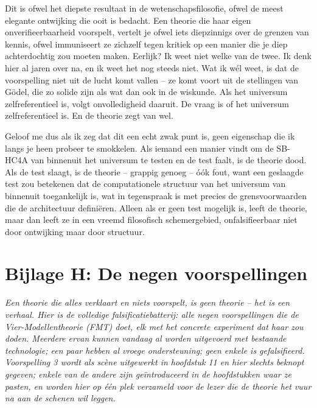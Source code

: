 \documentclass[11pt, twoside, openright]{book}
\begin{document}
Dit is ofwel het diepste resultaat in de wetenschapsfilosofie, ofwel de meest elegante ontwijking die ooit is bedacht. Een theorie die haar eigen onverifieerbaarheid voorspelt, vertelt je ofwel iets diepzinnigs over de grenzen van kennis, ofwel immuniseert ze zichzelf tegen kritiek op een manier die je diep achterdochtig zou moeten maken. Eerlijk? Ik weet niet welke van de twee. Ik denk hier al jaren over na, en ik weet het nog steeds niet. Wat ik wél weet, is dat de voorspelling niet uit de lucht komt vallen -- ze komt voort uit de stellingen van Gödel, die zo solide zijn als wat dan ook in de wiskunde. Als het universum zelfreferentieel is, volgt onvolledigheid daaruit. De vraag is of het universum zelfreferentieel is. En de theorie zegt van wel.

Geloof me dus als ik zeg dat dit een echt zwak punt is, geen eigenschap die ik langs je heen probeer te smokkelen. Als iemand een manier vindt om de SB-HC4A van binnenuit het universum te testen en de test faalt, is de theorie dood. Als de test slaagt, is de theorie -- grappig genoeg -- óók fout, want een geslaagde test zou betekenen dat de computationele structuur van het universum van binnenuit toegankelijk is, wat in tegenspraak is met precies de grensvoorwaarden die de architectuur definiëren. Alleen als er geen test mogelijk is, leeft de theorie, maar dan leeft ze in een vreemd filosofisch schemergebied, onfalsifieerbaar niet door ontwijking maar door structuur.


\chapter*{Bijlage H: De negen voorspellingen}

\textit{Een theorie die alles verklaart en niets voorspelt, is geen theorie -- het is een verhaal. Hier is de volledige falsificatiebatterij: alle negen voorspellingen die de Vier-Modellentheorie (FMT) doet, elk met het concrete experiment dat haar zou doden. Meerdere ervan kunnen vandaag al worden uitgevoerd met bestaande technologie; een paar hebben al vroege ondersteuning; geen enkele is gefalsifieerd. Voorspelling 3 wordt als scène uitgewerkt in hoofdstuk 11 en hier slechts beknopt gegeven; enkele van de andere zijn geïntroduceerd in de hoofdstukken waar ze pasten, en worden hier op één plek verzameld voor de lezer die de theorie het vuur na aan de schenen wil leggen.}
\end{document}
